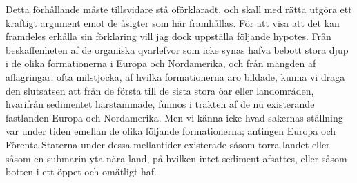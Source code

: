 Detta förhållande måste tillsvidare stå oförklaradt, och skall med rätta utgöra ett kraftigt argument emot de åsigter som här framhållas. För att visa att det kan framdeles erhålla sin förklaring vill jag dock uppställa följande hypotes. Från beskaffenheten af de organiska qvarlefvor som icke synas hafva bebott stora djup i de olika formationerna i Europa och Nordamerika, och från mängden af aflagringar, ofta milstjocka, af hvilka formationerna äro bildade, kunna vi draga den slutsatsen att från de första till de sista stora öar eller landområden, hvarifrån sedimentet härstammade, funnos i trakten af de nu existerande fastlanden Europa och Nordamerika. Men vi känna icke hvad sakernas ställning var under tiden emellan de olika följande formationerna; antingen Europa och Förenta Staterna under dessa mellantider existerade såsom torra landet eller såsom en submarin yta nära land, på hvilken intet sediment afsattes, eller såsom botten i ett öppet och omätligt haf.

